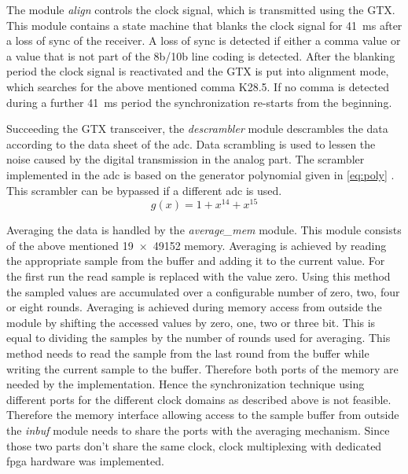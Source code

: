 \documentclass[12pt,a4paper,parskip=full,abstract=true,BCOR=12mm,twoside,open=right]{scrreprt}
\def\device#1{\textit{#1}}
\begin{document}
The module \device{align} controls the clock signal, which is transmitted using
the GTX. This module contains a state machine that blanks the clock signal
for \SI{41}{\milli\second} after a loss of sync of the receiver. A loss of sync is
detected if either a comma value or a value that is not part of the 8b/10b line coding
is detected. After the blanking period the clock signal is reactivated and
the GTX is put into alignment mode, which searches for the above mentioned comma
K28.5. If no comma is detected during a further \SI{41}{\milli\second} period the
synchronization re-starts from the beginning.

Succeeding the GTX transceiver, the \device{descrambler} module descrambles the data
according to the data sheet of the \gls{adc}\cite{ltc2274}. Data scrambling is
used to lessen the noise caused by the digital transmission in the analog part. The
scrambler implemented in the \gls{adc} is based on the generator polynomial given
in \cref{eq:poly} \cite{jesd205B.01}. This scrambler can be bypassed if a
different \gls{adc} is used.
\begin{equation}
    \label{eq:poly} g(x) = 1 + x^{14} + x^{15}
\end{equation}

Averaging the data is handled by the \device{average\_mem} module. This module
consists of the above mentioned \SI[product-units=brackets]{19 x 49152}{\bit} memory. Averaging is achieved
by reading the appropriate sample from the buffer and adding it to the current value.
For the first run the read sample is replaced with the value zero. Using this method
the sampled values are accumulated over a configurable number of zero, two,
four or eight rounds. Averaging is achieved during memory access from outside the module
by shifting the accessed values by zero, one, two or three bit. This is equal to dividing
the samples by the number of rounds used for averaging. This method needs to read
the sample from the last round from the buffer while writing the current sample
to the buffer. Therefore both ports of the memory are needed by the implementation.
Hence the synchronization technique using different ports for the different clock
domains as described above is not feasible. Therefore the memory interface allowing
access to the sample buffer from outside the \device{inbuf} module needs to share
the ports with the averaging mechanism. Since those two parts don't share the same
clock, clock multiplexing with dedicated \gls{fpga} hardware was implemented.
\end{document}
